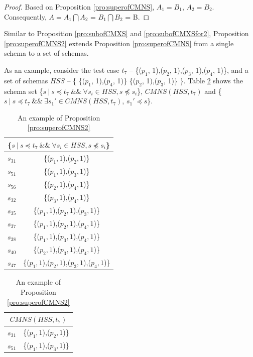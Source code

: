 {\begin{proof}
Based on Proposition \ref{pro:superofCMNS}, $A_{1} = B_{1}$, $A_{2} = B_{2}$. Consequently,
$A = A_{1} \bigcap A_{2}$ = $B_{1} \bigcap B_{2}$  = B.


\end{proof}

Similar to Proposition \ref{pro:subofCMXS} and \ref{pro:subofCMXSfor2},  Proposition \ref{pro:superofCMNS2} extends Proposition \ref{pro:superofCMNS} from a single  schema to a set of schemas.

As an example, consider the test case $t_{7}$ -- \{($p_{1}$, 1),($p_{2}$, 1),($p_{3}$, 1),($p_{4}$, 1)\}, and a set of schemas  $HSS$ -- \{ \{($p_{1}$, 1),($p_{4}$, 1)\}  \{($p_{2}$, 1),($p_{3}$, 1)\} \}. Table \ref{examleOfCMNSPro2} shows the schema set \{$s\ |\ s \preceq t_{7}\ \&\&\ \forall s_{i} \in HSS, s \npreceq s_{i} $\}, $CMNS(HSS, t_{7})$ and \{$ s\ |\ s \preceq t_{7} \ \&\& \ \exists s_{1}' \in CMNS(HSS, t_{7})$, $s_{1}' \preceq s$\}.

 \begin{table}[htbp]
  \centering
  \caption{An example of Proposition \ref{pro:superofCMNS2}}
  \label{examleOfCMNSPro2}
    \begin{tabular}{|c|c|} \hline
     \multicolumn{2}{|c|}{\{$s\ |\ s \preceq t_{7}\ \&\&\ \forall s_{i} \in HSS, s \npreceq s_{i} $\}} \\ \hline
   $s_{31}$ & \{($p_{1}, 1$),($p_{2}, 1$)\} \\
   $s_{51}$ & \{($p_{1}, 1$),($p_{3}, 1$)\} \\

   $s_{56}$ & \{($p_{2}, 1$),($p_{4}, 1$)\} \\
   $s_{32}$ & \{($p_{3}, 1$),($p_{4}, 1$)\} \\

   $s_{35}$ & \{($p_{1}, 1$),($p_{2}, 1$),($p_{3}, 1$)\} \\
   $s_{37}$ & \{($p_{1}, 1$),($p_{2}, 1$),($p_{4}, 1$)\} \\
   $s_{38}$ & \{($p_{1}, 1$),($p_{3}, 1$),($p_{4}, 1$)\} \\
   $s_{40}$ & \{($p_{2}, 1$),($p_{3}, 1$),($p_{4}, 1$)\} \\

   $s_{47}$ & \{($p_{1}, 1$),($p_{2}, 1$),($p_{3}, 1$),($p_{4}, 1$)\} \\ \hline
    \end{tabular}%
\quad
    \begin{tabular}{|c|c|} \hline
     \multicolumn{2}{|c|}{$CMNS(HSS, t_{7})$} \\ \hline
   $s_{31}$ & \{($p_{1}, 1$),($p_{2}, 1$)\} \\
   $s_{51}$ & \{($p_{1}, 1$),($p_{3}, 1$)\} \\


\end{tabular}
\end{table}}
